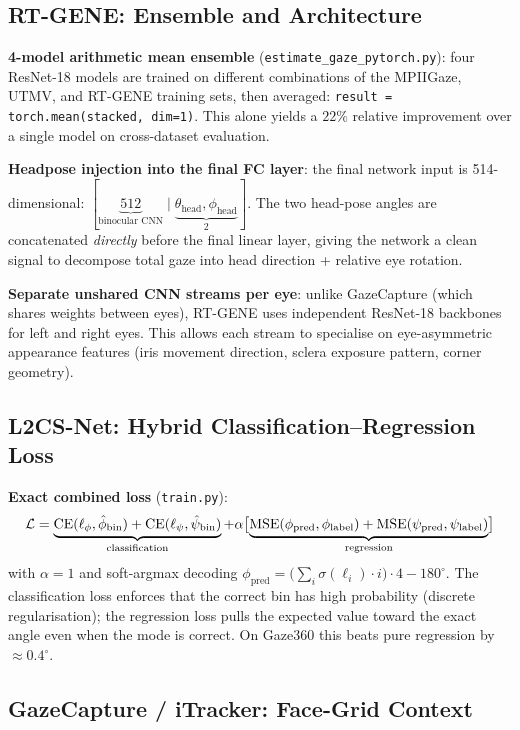 \documentclass[11pt,a4paper]{article}
\begin{document}
\subsection{RT-GENE: Ensemble and Architecture}

\textbf{4-model arithmetic mean ensemble} (\texttt{estimate\_gaze\_pytorch.py}):
four ResNet-18 models are trained on different combinations of the MPIIGaze, UTMV, and
RT-GENE training sets, then averaged: \texttt{result = torch.mean(stacked, dim=1)}.
This alone yields a $22\%$ relative improvement over a single model on cross-dataset evaluation.

\textbf{Headpose injection into the final FC layer}:
the final network input is 514-dimensional:
$[\underbrace{512}_{\text{binocular CNN}}\;|\;\underbrace{\theta_\text{head},\phi_\text{head}}_{2}]$.
The two head-pose angles are concatenated \emph{directly} before the final linear layer,
giving the network a clean signal to decompose total gaze into
head direction + relative eye rotation.

\textbf{Separate unshared CNN streams per eye}:
unlike GazeCapture (which shares weights between eyes),
RT-GENE uses independent ResNet-18 backbones for left and right eyes.
This allows each stream to specialise on eye-asymmetric appearance features
(iris movement direction, sclera exposure pattern, corner geometry).

\subsection{L2CS-Net: Hybrid Classification--Regression Loss}

\textbf{Exact combined loss} (\texttt{train.py}):
\[
  \mathcal{L} = \underbrace{\text{CE}(\ell_\phi, \hat{\phi}_{\rm bin}) +
                             \text{CE}(\ell_\psi, \hat{\psi}_{\rm bin})}_{\text{classification}}
              + \alpha\bigl[\underbrace{\text{MSE}(\phi_\text{pred}, \phi_\text{label}) +
                             \text{MSE}(\psi_\text{pred}, \psi_\text{label})}_{\text{regression}}\bigr]
\]
with $\alpha=1$ and soft-argmax decoding
$\phi_\text{pred} = \bigl(\sum_i \sigma(\ell_i) \cdot i\bigr)\cdot4 - 180^\circ$.
The classification loss enforces that the correct bin has high probability (discrete regularisation);
the regression loss pulls the expected value toward the exact angle even when the mode is correct.
On Gaze360 this beats pure regression by $\approx0.4^\circ$.

\subsection{GazeCapture / iTracker: Face-Grid Context}
\end{document}
